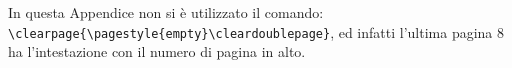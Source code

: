 In questa Appendice non si è utilizzato il comando:\\
\verb"\clearpage{\pagestyle{empty}\cleardoublepage}", ed infatti
l'ultima pagina 8 ha l'intestazione con il numero di pagina in
alto.
